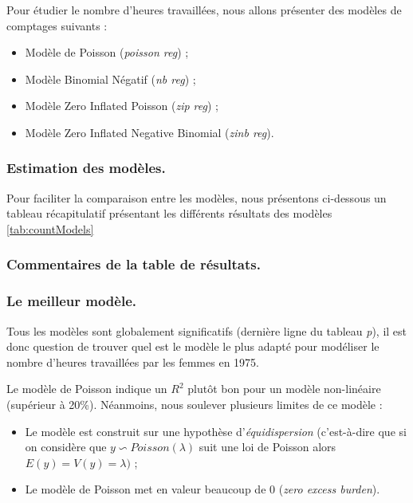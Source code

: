 
Pour étudier le nombre d'heures travaillées, nous allons présenter des modèles de comptages suivants : 

\begin{itemize}
    \item Modèle de Poisson (\emph{poisson reg}) ;
    \item Modèle Binomial Négatif (\emph{nb reg}) ; 
    \item Modèle Zero Inflated Poisson (\emph{zip reg}) ; 
    \item Modèle Zero Inflated Negative Binomial (\emph{zinb reg}).
\end{itemize}

\subsubsection*{Estimation des modèles.}

Pour faciliter la comparaison entre les modèles, nous présentons ci-dessous un tableau récapitulatif présentant les différents résultats des modèles \ref{tab:countModels} 

\clearpage

\begin{center}
        \small
    
    \normalsize
    \label{tab:countModels}
\end{center}


\subsubsection*{Commentaires de la table de résultats.}

\subsubsection*{Le meilleur modèle.}

Tous les modèles sont globalement significatifs (dernière ligne du tableau \emph{p}), il est donc question de trouver quel est le modèle le plus adapté pour modéliser le nombre d'heures travaillées par les femmes en 1975. 

\vspace*{0.3cm}

Le modèle de Poisson indique un $R^2$ plutôt bon pour un modèle non-linéaire (supérieur à 20\%). Néanmoins, nous soulever plusieurs limites de ce modèle : 

\vspace*{0.3cm}

\begin{itemize}
    \item Le modèle est construit sur une hypothèse d'\emph{équidispersion} (c'est-à-dire que si on considère que $y \backsim Poisson(\lambda)$ suit une loi de Poisson alors $E(y)=V(y)=\lambda)$ ; 
    \item Le modèle de Poisson met en valeur beaucoup de 0 (\emph{zero excess burden}).
\end{itemize}

